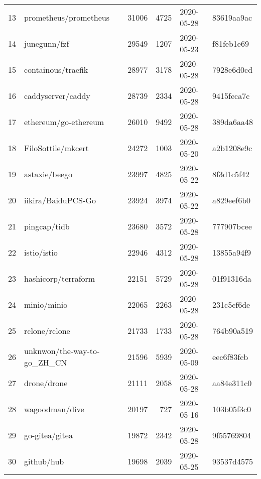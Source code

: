 \begin{longtable}{llrrll}
    13  &                              prometheus/prometheus &  31006 &   4725 & 2020-05-28 &  83619aa9ac \\
    14  &                                       junegunn/fzf &  29549 &   1207 & 2020-05-23 &  f81feb1e69 \\
    15  &                                 containous/traefik &  28977 &   3178 & 2020-05-28 &  7928e6d0cd \\
    16  &                                  caddyserver/caddy &  28739 &   2334 & 2020-05-28 &  9415feca7c \\
    17  &                               ethereum/go-ethereum &  26010 &   9492 & 2020-05-28 &  389da6aa48 \\
    18  &                                 FiloSottile/mkcert &  24272 &   1003 & 2020-05-20 &  a2b1208e9c \\
    19  &                                      astaxie/beego &  23997 &   4825 & 2020-05-22 &  8f3d1c5f42 \\
    20  &                                 iikira/BaiduPCS-Go &  23924 &   3974 & 2020-05-22 &  a829eef6b0 \\
    21  &                                       pingcap/tidb &  23680 &   3572 & 2020-05-28 &  777907bcee \\
    22  &                                        istio/istio &  22946 &   4312 & 2020-05-28 &  13855a94f9 \\
    23  &                                hashicorp/terraform &  22151 &   5729 & 2020-05-28 &  01f91316da \\
    24  &                                        minio/minio &  22065 &   2263 & 2020-05-28 &  231c5cf6de \\
    25  &                                      rclone/rclone &  21733 &   1733 & 2020-05-28 &  764b90a519 \\
    26  &                        unknwon/the-way-to-go\_ZH\_CN &  21596 &   5939 & 2020-05-09 &  eec6f83fcb \\
    27  &                                        drone/drone &  21111 &   2058 & 2020-05-28 &  aa84e311c0 \\
    28  &                                     wagoodman/dive &  20197 &    727 & 2020-05-16 &  103b05f3c0 \\
    29  &                                     go-gitea/gitea &  19872 &   2342 & 2020-05-28 &  9f55769804 \\
    30  &                                         github/hub &  19698 &   2039 & 2020-05-25 &  93537d4575 \\

\end{longtable}
